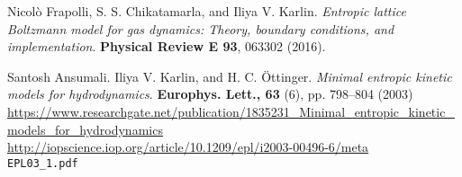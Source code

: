 \documentclass[twoside,landscape,10pt]{amsart}
\theoremstyle{plain}
\theoremstyle{definition}
\theoremstyle{remark}
\theoremstyle{remark}
\begin{document}
\begin{thebibliography}{9}
  Nicol\`{o} Frapolli, S. S. Chikatamarla, and Iliya V. Karlin.  \emph{Entropic lattice Boltzmann model for gas dynamics: Theory, boundary conditions, and implementation}.  \textbf{Physical Review E 93}, 063302 (2016).

Santosh	Ansumali.  Iliya V. Karlin, and H. C. \"{O}ttinger.  \emph{Minimal entropic kinetic models for hydrodynamics}.  \textbf{Europhys. Lett., 63} (6), pp. 798–804 (2003) \\
\url{https://www.researchgate.net/publication/1835231_Minimal_entropic_kinetic_models_for_hydrodynamics}   \\
\url{http://iopscience.iop.org/article/10.1209/epl/i2003-00496-6/meta} \\
\verb|EPL03_1.pdf|










\end{thebibliography}
\end{document}
